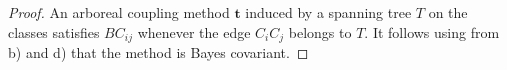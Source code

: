 \documentclass[twoside,11pt]{article}
\begin{document}
\begin{proof}

An arboreal coupling method $\boldsymbol{t}$ induced by a spanning tree $T$ on the classes satisfies $BC_{ij}$ whenever the edge $C_iC_j$ belongs to $T$. It follows using from b) and d) that the method is Bayes covariant.
	
	
%	
%	
%	
%	
%

\end{proof}
\end{document}
